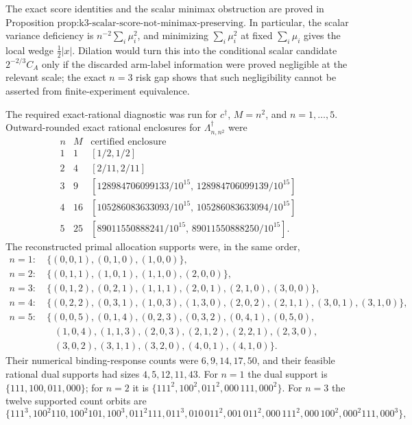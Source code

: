 The exact score identities and the scalar minimax obstruction are proved in Proposition \(\text{prop:k3-scalar-score-not-minimax-preserving}\).  In particular, the scalar variance deficiency is \(n^{-2}\sum_i\mu_i^2\), and minimizing \(\sum_i\mu_i^2\) at fixed \(\sum_i\mu_i\) gives the local wedge \(\tfrac12|x|\).  Dilation would turn this into the conditional scalar candidate \(2^{-2/3}C_A\) only if the discarded arm-label information were proved negligible at the relevant scale; the exact \(n=3\) risk gap shows that such negligibility cannot be asserted from finite-experiment equivalence.

The required exact-rational diagnostic was run for \(c^\dagger\), \(M=n^2\), and \(n=1,\ldots,5\).  Outward-rounded exact rational enclosures for \(\Lambda_{n,n^2}^\dagger\) were
\[
\begin{array}{c|c|c}
n&M&\text{certified enclosure}\\ \hline
1&1&[1/2,1/2]\\
2&4&[2/11,2/11]\\
3&9&[128984706099133/10^{15},\,128984706099139/10^{15}]\\
4&16&[105286083633093/10^{15},\,105286083633094/10^{15}]\\
5&25&[89011550888241/10^{15},\,89011550888250/10^{15}].
\end{array}
\]
The reconstructed primal allocation supports were, in the same order,
\[
\begin{aligned}
n=1:&\ \{(0,0,1),(0,1,0),(1,0,0)\},\\
n=2:&\ \{(0,1,1),(1,0,1),(1,1,0),(2,0,0)\},\\
n=3:&\ \{(0,1,2),(0,2,1),(1,1,1),(2,0,1),(2,1,0),(3,0,0)\},\\
n=4:&\ \{(0,2,2),(0,3,1),(1,0,3),(1,3,0),(2,0,2),(2,1,1),(3,0,1),(3,1,0)\},\\
n=5:&\ \{(0,0,5),(0,1,4),(0,2,3),(0,3,2),(0,4,1),(0,5,0),\\
&\quad (1,0,4),(1,1,3),(2,0,3),(2,1,2),(2,2,1),(2,3,0),\\
&\quad (3,0,2),(3,1,1),(3,2,0),(4,0,1),(4,1,0)\}.
\end{aligned}
\]
Their numerical binding-response counts were \(6,9,14,17,50\), and their feasible rational dual supports had sizes \(4,5,12,11,43\).  For \(n=1\) the dual support is \(\{111,100,011,000\}\); for \(n=2\) it is \(\{111^2,100^2,011^2,000\,111,000^2\}\).  For \(n=3\) the twelve supported count orbits are
\[
 \{111^3,100^2 110,100^2 101,100^3,011^2 111,011^3,
 010\,011^2,001\,011^2,000\,111^2,000\,100^2,000^2 111,000^3\},
\]
